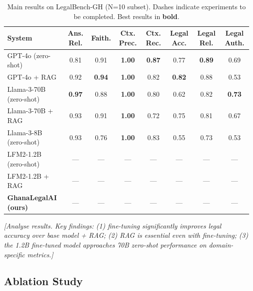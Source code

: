 \documentclass[11pt]{article}
\begin{document}
\begin{table}[t]
\centering
\small
\begin{tabular}{lccccccc}
\toprule
\textbf{System} & \textbf{Ans. Rel.} & \textbf{Faith.} & \textbf{Ctx. Prec.} & \textbf{Ctx. Rec.} & \textbf{Legal Acc.} & \textbf{Legal Rel.} & \textbf{Legal Auth.} \\
\midrule
GPT-4o (zero-shot) & 0.81 & 0.91 & \textbf{1.00} & \textbf{0.87} & 0.77 & \textbf{0.89} & 0.69 \\
GPT-4o + RAG & 0.92 & \textbf{0.94} & \textbf{1.00} & 0.82 & \textbf{0.82} & 0.88 & 0.53 \\
Llama-3-70B (zero-shot) & \textbf{0.97} & 0.88 & \textbf{1.00} & 0.80 & 0.62 & 0.82 & \textbf{0.73} \\
Llama-3-70B + RAG & 0.93 & 0.91 & \textbf{1.00} & 0.72 & 0.75 & 0.81 & 0.67 \\
Llama-3-8B (zero-shot) & 0.93 & 0.76 & \textbf{1.00} & 0.83 & 0.55 & 0.73 & 0.53 \\
LFM2-1.2B (zero-shot) & --- & --- & --- & --- & --- & --- & --- \\
LFM2-1.2B + RAG & --- & --- & --- & --- & --- & --- & --- \\
\midrule
\textbf{GhanaLegalAI (ours)} & --- & --- & --- & --- & --- & --- & --- \\
\bottomrule
\end{tabular}
\caption{Main results on LegalBench-GH (N=10 subset). Dashes indicate experiments to be completed. Best results in \textbf{bold}.}
\label{tab:main-results}
\end{table}

\textit{[Analyse results. Key findings: (1) fine-tuning significantly
improves legal accuracy over base model + RAG; (2) RAG is essential
even with fine-tuning; (3) the 1.2B fine-tuned model approaches
70B zero-shot performance on domain-specific metrics.]}


\subsection{Ablation Study}
\end{document}
